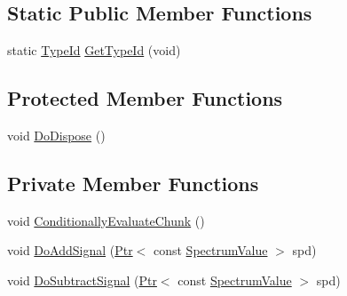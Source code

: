 \subsection*{Static Public Member Functions}
\begin{DoxyCompactItemize}
\item 
static \hyperlink{classns3_1_1TypeId}{Type\+Id} \hyperlink{classns3_1_1SpectrumInterference_aef8f8ba9e6f7dde190e40ddcc0cdac28}{Get\+Type\+Id} (void)
\end{DoxyCompactItemize}
\subsection*{Protected Member Functions}
\begin{DoxyCompactItemize}
\item 
void \hyperlink{classns3_1_1SpectrumInterference_a346908d53a5a84b13285d782bc50dd08}{Do\+Dispose} ()
\end{DoxyCompactItemize}
\subsection*{Private Member Functions}
\begin{DoxyCompactItemize}
\item 
void \hyperlink{classns3_1_1SpectrumInterference_a372157c6578de4fa38f67d4e8746ff04}{Conditionally\+Evaluate\+Chunk} ()
\item 
void \hyperlink{classns3_1_1SpectrumInterference_aa803e02fc1fa085c35657dbd821ef7eb}{Do\+Add\+Signal} (\hyperlink{classns3_1_1Ptr}{Ptr}$<$ const \hyperlink{classns3_1_1SpectrumValue}{Spectrum\+Value} $>$ spd)
\item 
void \hyperlink{classns3_1_1SpectrumInterference_a69d0a152b6e6a286489738ce3d623a12}{Do\+Subtract\+Signal} (\hyperlink{classns3_1_1Ptr}{Ptr}$<$ const \hyperlink{classns3_1_1SpectrumValue}{Spectrum\+Value} $>$ spd)
\end{DoxyCompactItemize}
